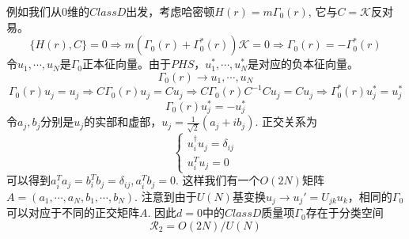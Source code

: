 \documentclass[a4paper]{article}
\numberwithin{equation}{subsection}
\begin{document}
例如我们从$0$维的$Class D$出发，考虑哈密顿$H(r)=m\Gamma_0(r)$, 它与$C=\mathcal{K}$反对易。
\begin{equation}
    \{H(r),C\}=0\Rightarrow m(\Gamma_0(r)+\Gamma_0^*(r))\mathcal{K}=0\Rightarrow \Gamma_0(r)=-\Gamma_0^*(r)
\end{equation}
令$u_1,\cdots,u_N$是$\Gamma_0$正本征向量。由于$PHS$，$u_1^*,\cdots,u_N^*$是对应的负本征向量。
\begin{equation}
    \Gamma_0(r)\rightarrow u_1,\cdots,u_N
\end{equation}
\begin{equation}
    \Gamma_0(r)u_j=u_j\Rightarrow C\Gamma_0(r) u_j=Cu_j\Rightarrow C\Gamma_0(r)C^{-1}Cu_j=Cu_j\Rightarrow \Gamma_0^*(r)u_j^*=u^*_j
\end{equation}
\begin{equation}
    \Gamma_0(r)u_j^*=-u_j^*
\end{equation}
令$a_j,b_j$分别是$u_j$的实部和虚部，$u_j=\frac{1}{\sqrt{2}}(a_j+ib_j)$. 正交关系为
\begin{equation}
    \begin{cases}
        u_i^\dagger u_j=\delta_{ij}\\
        u_i^T u_j=0
    \end{cases}
\end{equation}
可以得到$a_i^T a_j=b_i^Tb_j=\delta_{ij},a_i^Tb_j=0$. 这样我们有一个$O(2N)$矩阵$A=(a_1,\cdots,a_N,b_1,\cdots,b_N)$. 注意到由于$U(N)$基变换$u_j\rightarrow u_j'=U_{jk}u_k$，相同的$\Gamma_0$可以对应于不同的正交矩阵$A$. 因此$d=0$中的$Class D$质量项$\Gamma_0$存在于分类空间
\begin{equation}
    \mathcal{R}_2=O(2N)/U(N)
\end{equation}
\end{document}

